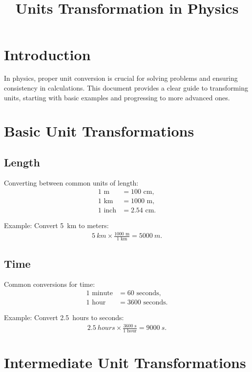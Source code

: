 \documentclass{article}
\title{Units Transformation in Physics}
\author{}
\date{}
\begin{document}
\maketitle

\section*{Introduction}
In physics, proper unit conversion is crucial for solving problems and ensuring consistency in calculations. This document provides a clear guide to transforming units, starting with basic examples and progressing to more advanced ones.

\section{Basic Unit Transformations}

\subsection{Length}
Converting between common units of length:
\begin{align*}
1 \text{ m} &= 100 \text{ cm}, \\
1 \text{ km} &= 1000 \text{ m}, \\
1 \text{ inch} &= 2.54 \text{ cm}.
\end{align*}

Example:
Convert \SI{5}{km} to meters:
\begin{align*}
\SI{5}{km} \times \frac{1000 \text{ m}}{1 \text{ km}} = \SI{5000}{m}.
\end{align*}

\subsection{Time}
Common conversions for time:
\begin{align*}
1 \text{ minute} &= 60 \text{ seconds}, \\
1 \text{ hour} &= 3600 \text{ seconds}.
\end{align*}

Example:
Convert \SI{2.5}{hours} to seconds:
\begin{align*}
\SI{2.5}{hours} \times \frac{3600 \text{ s}}{1 \text{ hour}} = \SI{9000}{s}.
\end{align*}

\section{Intermediate Unit Transformations}
\end{document}
